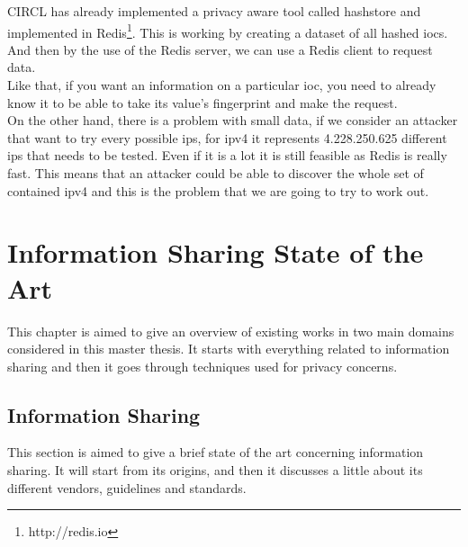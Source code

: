 \documentclass{eplmastersthesis}
\begin{document}
CIRCL has already implemented a privacy aware tool called hashstore and implemented in Redis\footnote{http://redis.io}. This is working by creating a dataset of all hashed \gls{ioc}s. And then by the use of the Redis server, we can use a Redis client to request data.\\
Like that, if you want an information on a particular \gls{ioc}, you need to already know it to be able to take its value's fingerprint and make the request.\\

On the other hand, there is a problem with small data, if we consider an attacker that want to try every possible \gls{ip}s, for \gls{ipv4} it represents 4.228.250.625 different \gls{ip}s that needs to be tested. Even if it is a lot it is still feasible as Redis is really fast. This means that an attacker could be able to discover the whole set of contained \gls{ipv4} and this is the problem that we are going to try to work out.


\chapter{Information Sharing State of the Art}

This chapter is aimed to give an overview of existing works in two main domains considered in this master thesis. It starts with everything related to information sharing and then it goes through techniques used for privacy concerns.\\

\section{Information Sharing}
This section is aimed to give a brief state of the art concerning information sharing. It will start from its origins, and then it discusses a little about its different vendors, guidelines and standards.
\end{document}
